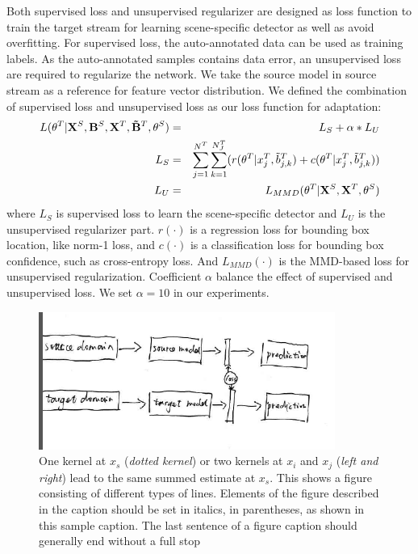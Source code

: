 \documentclass[runningheads]{llncs}
\begin{document}
Both supervised loss and unsupervised regularizer are designed as loss function to train the target stream for learning scene-specific detector as well as avoid overfitting. For supervised loss, the auto-annotated data can be used as training labels. As the auto-annotated samples contains data error, an unsupervised loss are required to regularize the network. We take the source model in source stream as a reference for feature vector distribution. We defined the combination of supervised loss and unsupervised loss as our loss function for adaptation:
\begin{eqnarray}
  L(\theta^{T}|{\bf X}^{S},{\bf B}^{S},{\bf X}^{T},{\bf \tilde{B}}^{T},\theta^{S}) &=& L_{S} + \alpha * L_{U} \\
  L_{S} &=&  \sum^{N^{T}}_{j=1}{\sum^{N^{T}_{J}}_{k=1}( r(\theta^{T}|x^{T}_{j},\tilde{b}^{T}_{j,k})+c(\theta^{T}|x^{T}_{j},\tilde{b}^{T}_{j,k}) )} \\
  L_{U} &=& L_{MMD}(\theta^{T}|{\bf X}^{S},{\bf X}^{T},\theta^{S}) \label{Eq:lmmd}
\end{eqnarray}
where $L_{S}$ is supervised loss to learn the scene-specific detector and $L_{U}$ is the unsupervised regularizer part. $r(\cdot)$ is a regression loss for bounding box location, like norm-1 loss, and $c(\cdot)$ is a classification loss for bounding box confidence, such as cross-entropy loss. And $L_{MMD}(\cdot)$ is the MMD-based loss for unsupervised regularization. Coefficient $\alpha$ balance the effect of supervised and unsupervised loss. We set $\alpha = 10$ in our experiments.

\begin{figure}
\centering
\includegraphics[height=4.5cm]{images/streams.png}
\caption{One kernel at $x_s$ ({\it dotted kernel}) or two kernels at
$x_i$ and $x_j$ ({\it left and right}) lead to the same summed estimate
at $x_s$. This shows a figure consisting of different types of
lines. Elements of the figure described in the caption should be set in
italics,
in parentheses, as shown in this sample caption. The last
sentence of a figure caption should generally end without a full stop}
\label{fig:example}
\end{figure}
\end{document}
